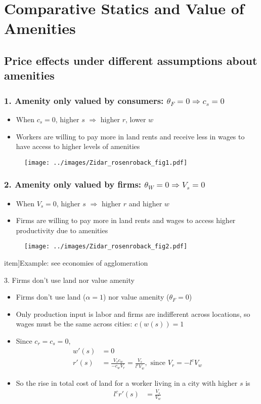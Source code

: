 \documentclass[10pt,notes=hide]{beamer}
\begin{document}
\section{Comparative Statics and Value of Amenities}
\subsection{Price effects under different assumptions about amenities}
\begin{frame}
\frametitle{1. Amenity only valued by consumers: $\theta_F=0 \Rightarrow c_s = 0$}
\begin{itemize}
\item When $c_s = 0$, higher $s$ $\Rightarrow$ higher $r$, lower $w$
\item Workers are willing to pay more in land rents and receive less in wages to have access to higher levels of amenities
\end{itemize}
\begin{figure}
\texttt{[image: ../images/Zidar\_rosenroback\_fig1.pdf]}
\end{figure}
\end{frame}
\begin{frame}
\frametitle{2. Amenity only valued by firms: $\theta_W=0 \Rightarrow  V_s = 0$}
\begin{itemize}
\item When $V_s = 0$, higher $s$ $\Rightarrow$ higher $r$ and higher $w$
\item Firms are willing to pay more in land rents and wages to access higher productivity due to amenities
\end{itemize}
\begin{figure}
\texttt{[image: ../images/Zidar\_rosenroback\_fig2.pdf]}
\end{figure}
item]{Example: see economies of agglomeration}
\end{frame}
\begin{frame}{3. Firms don't use land nor value amenity}
\begin{itemize}
\item Firms don't use land ($\alpha=1$) nor value amenity ($\theta_F=0$)
\item Only production input is labor and firms are indifferent across locations, so wages must be the same across cities: $c(w(s))=1$\\$\;$\\
\item Since  $c_r = c_s = 0$, 
\begin{align*}
w'(s) &= 0 \\
r'(s) &= \frac{V_sc_w}{- c_wV_r} = \frac{V_s}{ l^c V_w}, \text{ since } V_r = -l^c V_w
\end{align*} 
\item So the rise in total cost of land for a worker living in a city with higher $s$ is 
\begin{align*}
l^c r'(s) &=  \frac{V_s}{ V_w}
\end{align*} 
\end{itemize}
\end{frame}
\end{document}
